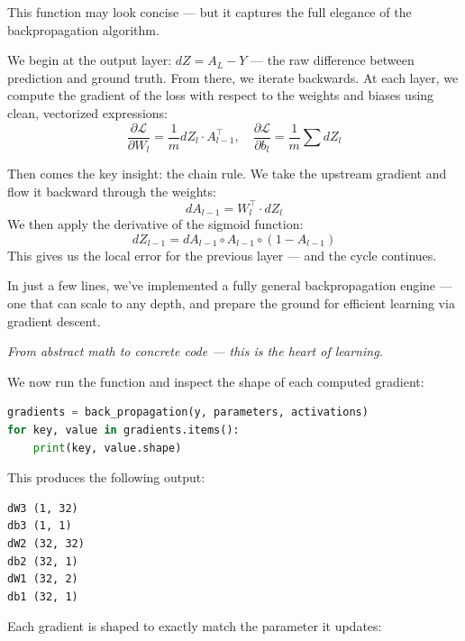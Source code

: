 \documentclass[11pt]{article}
\begin{document}
This function may look concise — but it captures the full elegance of the backpropagation algorithm.

\medskip

We begin at the output layer: $dZ = A_L - Y$ — the raw difference between prediction and ground truth. From there, we iterate backwards.  
At each layer, we compute the gradient of the loss with respect to the weights and biases using clean, vectorized expressions:
\[
\frac{\partial \mathcal{L}}{\partial W_l} = \frac{1}{m} dZ_l \cdot A_{l-1}^\top, \quad
\frac{\partial \mathcal{L}}{\partial b_l} = \frac{1}{m} \sum dZ_l
\]

Then comes the key insight: the chain rule.  
We take the upstream gradient and flow it backward through the weights:
\[
dA_{l-1} = W_l^\top \cdot dZ_l
\]
We then apply the derivative of the sigmoid function:
\[
dZ_{l-1} = dA_{l-1} \circ A_{l-1} \circ (1 - A_{l-1})
\]
This gives us the local error for the previous layer — and the cycle continues.

\medskip

\noindent
In just a few lines, we’ve implemented a fully general backpropagation engine — one that can scale to any depth, and prepare the ground for efficient learning via gradient descent.

\vspace{2em}
\begin{center}
\Large \textit{From abstract math to concrete code — this is the heart of learning.}
\end{center}


\bigskip

We now run the function and inspect the shape of each computed gradient:

\vspace{0.5em}
\begin{lstlisting}[language=Python, frame=single, basicstyle=\ttfamily\small]
gradients = back_propagation(y, parameters, activations)
for key, value in gradients.items():
    print(key, value.shape)
\end{lstlisting}

\bigskip

This produces the following output:

\begin{verbatim}
dW3 (1, 32)
db3 (1, 1)
dW2 (32, 32)
db2 (32, 1)
dW1 (32, 2)
db1 (32, 1)
\end{verbatim}

\bigskip

\noindent
Each gradient is shaped to exactly match the parameter it updates:
\end{document}

